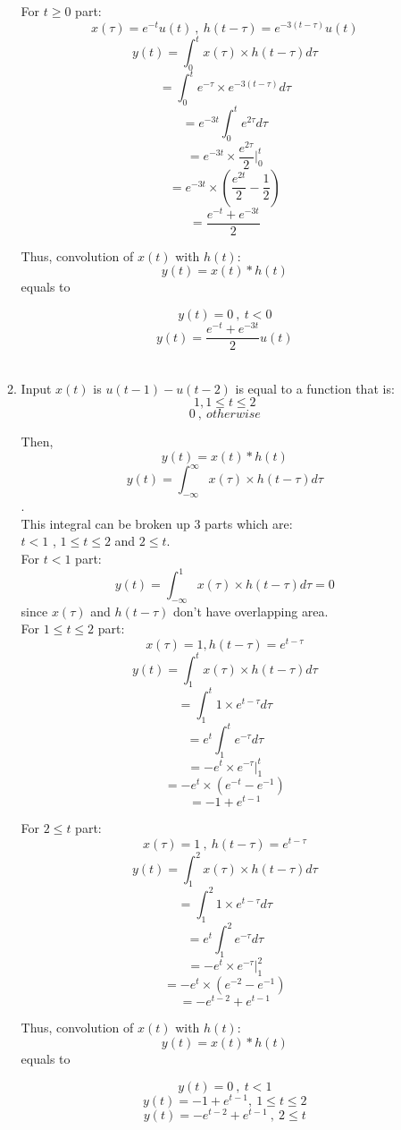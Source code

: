 \documentclass[10pt,a4paper, margin=1in]{article}
\begin{document}
\begin{enumerate}
\begin{enumerate}
    For $t\geq 0$ part:
    \[x(\tau) = e^{-t}u(t)\ ,\ h(t-\tau)=e^{-3(t-\tau)}u(t)\]
    \[y(t) = \int_{0}^{t} x(\tau) \times h(t-\tau) d\tau \]
    \[= \int_{0}^{t} e^{-\tau} \times e^{-3(t-\tau)} d\tau \]
    \[= e^{-3t}\int_{0}^{t} e^{2\tau} d\tau \]
    \[= e^{-3t}\times \frac{e^{2\tau}}{2} \vert_{0}^{t}\]
    \[= e^{-3t}\times (\frac{e^{2t}}{2}-\frac{1}{2})\]
    \[= \frac{e^{-t}+e^{-3t}}{2}\]
    
    Thus, convolution of $x(t)$ with $h(t)$:
    \[y(t)=x(t)*h(t)\]
    equals to
    
    \[y(t)=0\ ,\ t<0 \]
    \[y(t)=\frac{e^{-t}+e^{-3t}}{2}u(t) \] \\
    
     \item %
    Input $x(t)$ is $u(t-1) - u(t-2)$ is equal to a function that is:\\
    \[ 1 , 1\leq t \leq 2 \]
    \[ 0\ ,\ otherwise \]
    
    Then, \[y(t)=x(t)*h(t)\]
    \[y(t) = \int_{-\infty}^{\infty} x(\tau) \times h(t-\tau) d\tau\].\\
    
    This integral can be broken up 3 parts which are:\\
    $t<1$ , $1\leq t \leq 2$ and $2\leq t$.\\
    
    For $t<1$ part:
    \[y(t) = \int_{-\infty}^{1} x(\tau) \times h(t-\tau) d\tau = 0\] since $x(\tau)$ and $h(t-\tau)$ don't have overlapping area.\\
    
    For $1\leq t \leq 2$ part:
    \[x(\tau) = 1, h(t-\tau)=e^{t-\tau} \]
    \[y(t) = \int_{1}^{t} x(\tau) \times h(t-\tau) d\tau \]
    \[= \int_{1}^{t} 1 \times e^{t-\tau} d\tau \]
    \[= e^t\int_{1}^{t} e^{-\tau} d\tau \]
    \[= -e^t\times e^{-\tau} \vert_{1}^{t}\]
    \[= -e^t\times (e^{-t}-e^{-1})\]
    \[= -1 +e^{t-1}\]
    
    For $2\leq t$ part:
    \[x(\tau) = 1\ ,\ h(t-\tau)=e^{t-\tau} \]
    \[y(t) = \int_{1}^{2} x(\tau) \times h(t-\tau) d\tau \]
    \[= \int_{1}^{2} 1 \times e^{t-\tau} d\tau \]
    \[= e^t\int_{1}^{2} e^{-\tau} d\tau \]
    \[= -e^t\times e^{-\tau} \vert_{1}^{2}\]
    \[= -e^t\times (e^{-2}-e^{-1})\]
    \[= -e^{t-2} +e^{t-1}\]
    
    Thus, convolution of $x(t)$ with $h(t)$:
    \[y(t)=x(t)*h(t)\]
    equals to
    
    \[y(t)=0\ ,\ t<1 \]
    \[y(t)=-1 +e^{t-1} ,\ 1\leq t \leq 2 \]
    \[y(t)=-e^{t-2} +e^{t-1}\ ,\ 2\leq t \]
    

\end{enumerate}
\end{enumerate}
\end{document}
